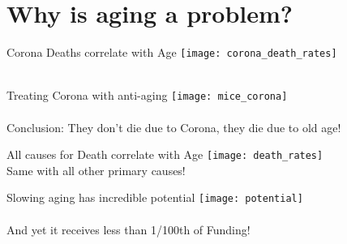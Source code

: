 \section{Why is aging a problem?}


\begin{frame}[c]{Corona Deaths correlate with Age}
    \large
    \texttt{[image: corona\_death\_rates]} \\
    \cite{10.1111/acel.13230} \\
\end{frame}


\begin{frame}[c]{Treating Corona with anti-aging}
    \large
    \texttt{[image: mice\_corona]} \\
    \cite{camell2021senolytics} \\
    \pause
    Conclusion: They don't die due to Corona, they die due to old age!
\end{frame}


\begin{frame}[c]{All causes for Death correlate with Age}
    \large
    \texttt{[image: death\_rates]} \\
    \pause
    Same with all other primary causes!
\end{frame}


\begin{frame}[c]{Slowing aging has incredible potential}
    \large
    \texttt{[image: potential]} \\
    \cite{10.1093/ppar/prz022} \\
    \pause
    And yet it receives less than 1/100th of Funding!
\end{frame}


